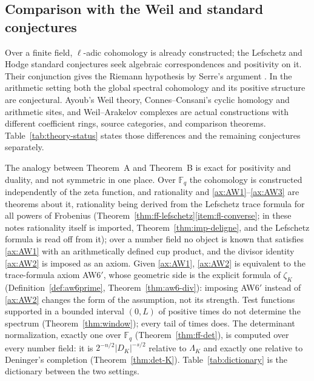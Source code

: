 \documentclass[11pt]{amsart}
\theoremstyle{plain}
\theoremstyle{definition}
\theoremstyle{remark}
\numberwithin{equation}{section}
\newcommand{\F}{\mathbb{F}}
\begin{document}
\subsection{Comparison with the Weil and standard conjectures}

Over a finite field, $\ell$-adic cohomology is already constructed;
the Lefschetz and Hodge standard conjectures seek algebraic
correspondences and positivity on it. Their conjunction gives the
Riemann hypothesis by Serre's argument
\cite[Theorem~5-6, p.~19]{Kleiman1994Standard}. In the arithmetic
setting both the global spectral cohomology and its positive structure
are conjectural. Ayoub's Weil theory, Connes--Consani's cyclic homology
and arithmetic sites, and Weil--Arakelov complexes are actual
constructions with different coefficient rings, source categories, and
comparison theorems. Table~\ref{tab:theory-status} states those
differences and the remaining conjectures separately.

The analogy between Theorem~A and Theorem~B is exact for positivity and
duality, and not symmetric in one place. Over $\F_q$ the cohomology is
constructed independently of the zeta function, and rationality and
\ref{ax:AW1}--\ref{ax:AW3} are theorems about it, rationality being
derived from the Lefschetz trace formula for all powers of Frobenius
(Theorem~\ref{thm:ff-lefschetz}\ref{item:fl-converse}; in these notes
rationality itself is imported, Theorem~\ref{thm:imp-deligne}, and the
Lefschetz formula is read off from it); over a number
field no object is
known that satisfies \ref{ax:AW1} with an arithmetically defined cup
product, and the divisor identity \ref{ax:AW2} is imposed as an axiom.
Given \ref{ax:AW1}, \ref{ax:AW2} is equivalent to the trace-formula
axiom AW6$'$, whose geometric side is the explicit formula of
$\zeta_K$ (Definition~\ref{def:aw6prime},
Theorem~\ref{thm:aw6-div}): imposing AW6$'$ instead of \ref{ax:AW2}
changes the form of the assumption, not its strength. Test functions
supported in a bounded interval $(0,L)$ of positive times do not
determine the spectrum (Theorem~\ref{thm:window}); every tail of times
does. The determinant
normalization, exactly one over $\F_q$ (Theorem~\ref{thm:ff-det}), is
computed over every number field: it is $2^{-n/2}|D_K|^{-s/2}$
relative to $\Lambda_K$ and exactly one relative to Deninger's
completion (Theorem~\ref{thm:det-K}).
Table~\ref{tab:dictionary} is the dictionary between the
two settings.
\end{document}
